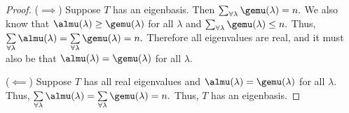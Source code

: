 \begin{proof}
    ($\implies$) Suppose $T$ has an eigenbasis. Then $\sum_{\forall\lambda} \gemu(\lambda) = n.$ We also know that $\almu(\lambda) \geq \gemu(\lambda)$ for all $\lambda$ and $\sum_{\forall\lambda} \gemu(\lambda) \leq n.$ Thus, $\sum\limits_{\forall\lambda} \almu(\lambda) = \sum\limits_{\forall\lambda} \gemu(\lambda) = n.$ Therefore all eigenvalues are real, and it must also be that $\almu(\lambda) = \gemu(\lambda)$ for all $\lambda.$
    
    ($\impliedby$) Suppose $T$ has all real eigenvalues and $\almu(\lambda) = \gemu(\lambda)$ for all $\lambda.$ Thus, $\sum\limits_{\forall\lambda} \almu(\lambda) = \sum\limits_{\forall\lambda} \gemu(\lambda) = n.$ Thus, $T$ has an eigenbasis.
\end{proof}